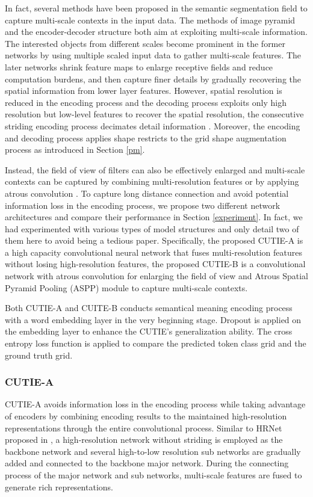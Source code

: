 \documentclass[10pt,twocolumn,letterpaper]{article}
\begin{document}
In fact, several methods have been proposed in the semantic segmentation field to capture multi-scale contexts in the input data. The methods of image pyramid and the encoder-decoder structure both aim at exploiting multi-scale information. The interested objects from different scales become prominent in the former networks by using multiple scaled input data to gather multi-scale features. The later networks shrink feature maps to enlarge receptive fields and reduce computation burdens, and then capture finer details by gradually recovering the spatial information from lower layer features. However, spatial resolution is reduced in the encoding process and the decoding process exploits only high resolution but low-level features to recover the spatial resolution, the consecutive striding encoding process decimates detail information \cite{hrnet}. Moreover, the encoding and decoding process applies shape restricts to the grid shape augmentation process as introduced in Section \ref{pm}. 

Instead, the field of view of filters can also be effectively enlarged and multi-scale contexts can be captured by combining multi-resolution features \cite{hrnet} or by applying atrous convolution \cite{deeplab, deeplabv1, deeplabv3, deeplabv3p}. To capture long distance connection and avoid potential information loss in the encoding process, we propose two different network architectures and compare their performance in Section \ref{experiment}. In fact, we had experimented with various types of model structures and only detail two of them here to avoid being a tedious paper. Specifically, the proposed CUTIE-A is a high capacity convolutional neural network that fuses multi-resolution features without losing high-resolution features, the proposed CUTIE-B is a convolutional network with atrous convolution for enlarging the field of view and Atrous Spatial Pyramid Pooling (ASPP) module to capture multi-scale contexts. 

Both CUTIE-A and CUITE-B conducts semantical meaning encoding process with a word embedding layer in the very beginning stage. Dropout is applied on the embedding layer to enhance the CUTIE's generalization ability. The cross entropy loss function is applied to compare the predicted token class grid and the ground truth grid.

\subsubsection{CUTIE-A}
CUTIE-A avoids information loss in the encoding process while taking advantage of encoders by combining encoding results to the maintained high-resolution representations through the entire convolutional process. Similar to HRNet proposed in \cite{hrnet}, a high-resolution network without striding is employed as the backbone network and several high-to-low resolution sub networks are gradually added and connected to the backbone major network. During the connecting process of the major network and sub networks, multi-scale features are fused to generate rich representations.
\end{document}
